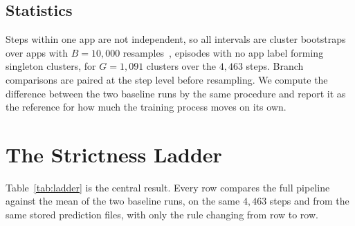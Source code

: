 \documentclass[runningheads,a4paper]{llncs}
\begin{document}
\subsection{Statistics}
Steps within one app are not independent, so all intervals are cluster bootstraps over apps with
$B = 10{,}000$ resamples~\cite{cameron2008}, episodes with no app label forming singleton
clusters, for $G = 1{,}091$ clusters over the $4{,}463$ steps. Branch comparisons are paired at
the step level before resampling. We compute the difference between the two baseline runs by the
same procedure and report it as the reference for how much the training process moves on its own.

\section{The Strictness Ladder}
\label{sec:ladder}

Table~\ref{tab:ladder} is the central result. Every row compares the full pipeline against the
mean of the two baseline runs, on the same $4{,}463$ steps and from the same stored prediction
files, with only the rule changing from row to row.
\end{document}
